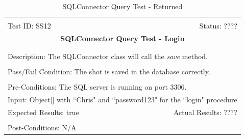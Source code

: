 \documentclass[11pt]{article}
\begin{document}
\begin{center}
\begin{table}[H]
\begin{tabular}{|l r|}\hline&\\[-2mm]
	Test ID: SS12	&Status: ????\\[-3mm]
	\multicolumn{2}{|c|}{\textbf{\large{SQLConnector Query Test - Login}}}\\&\\\hline&\\[-3mm]
	\multicolumn{2}{|p{\textwidth}|}{Description: The SQLConnector class will call the \textit{save} method.}\\[1mm]\hline&\\[-3mm]
	\multicolumn{2}{|p{\textwidth}|}{Pass/Fail Condition: The shot is saved in the database correctly.}\\[1mm]\hline&\\[-3mm]
	\multicolumn{2}{|p{\textwidth}|}{Pre-Conditions: The SQL server is running on port 3306.}\\[4mm]
	\multicolumn{2}{|p{\textwidth}|}{Input: Object[] with ``Chris" and ``password123" for the ``login" procedure}\\[2mm]\hline
	\multicolumn{1}{|p{0.49\textwidth}}{Expected Results: true}	&\multicolumn{1}{|p{0.45\textwidth}|}{Actual Results: ????}\\\hline&\\[-3mm]
	\multicolumn{2}{|p{\textwidth}|}{Post-Conditions: N/A}\\\hline
\end{tabular}
\caption{SQLConnector Query Test - Returned}
\end{table}
\end{center}
\end{document}
